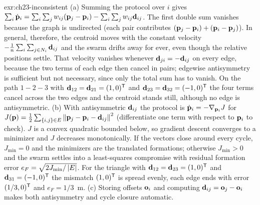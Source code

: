 \begin{solution}{exr:ch23-inconsistent}
(a) Summing the protocol over $i$ gives $\sum_i\dot{\mathbf{p}}_i=\sum_i\sum_j w_{ij}(\mathbf{p}_j-\mathbf{p}_i)-\sum_i\sum_j w_{ij}\mathbf{d}_{ij}$. The first double sum vanishes because the graph is undirected (each pair contributes $(\mathbf{p}_j-\mathbf{p}_i)+(\mathbf{p}_i-\mathbf{p}_j)$). In general, therefore, the centroid moves with the constant velocity $-\frac1n\sum_i\sum_{j\in N_i}\mathbf{d}_{ij}$ and the swarm drifts away for ever, even though the relative positions settle. That velocity vanishes whenever $\mathbf{d}_{ji}=-\mathbf{d}_{ij}$ on every edge, because the two terms of each edge then cancel in pairs; edgewise antisymmetry is sufficient but not necessary, since only the total sum has to vanish. On the path $1-2-3$ with $\mathbf{d}_{12}=\mathbf{d}_{21}=(1,0)^{\mathsf{T}}$ and $\mathbf{d}_{23}=\mathbf{d}_{32}=(-1,0)^{\mathsf{T}}$ the four terms cancel across the two edges and the centroid stands still, although no edge is antisymmetric. (b) With antisymmetric $\mathbf{d}_{ij}$ the protocol is $\dot{\mathbf{p}}_i=-\nabla_{\mathbf{p}_i}J$ for $J(\mathbf{p})=\tfrac12\sum_{\{i,j\}\in E}\left\lVert \mathbf{p}_j-\mathbf{p}_i-\mathbf{d}_{ij} \right\rVert^2$ (differentiate one term with respect to $\mathbf{p}_i$ to check). $J$ is a convex quadratic bounded below, so gradient descent converges to a minimizer and $J$ decreases monotonically. If the vectors close around every cycle, $J_{\min}=0$ and the minimizers are the translated formations; otherwise $J_{\min}>0$ and the swarm settles into a least-squares compromise with residual formation error $e_F=\sqrt{2J_{\min}/\left\lvert E \right\rvert}$. For the triangle with $\mathbf{d}_{12}=\mathbf{d}_{23}=(1,0)^{\mathsf{T}}$ and $\mathbf{d}_{31}=(-1,0)^{\mathsf{T}}$ the mismatch $(1,0)^{\mathsf{T}}$ is spread evenly, each edge ends with error $(1/3,0)^{\mathsf{T}}$ and $e_F=1/3$~m. (c) Storing offsets $\mathbf{o}_i$ and computing $\mathbf{d}_{ij}=\mathbf{o}_j-\mathbf{o}_i$ makes both antisymmetry and cycle closure automatic.
\end{solution}

